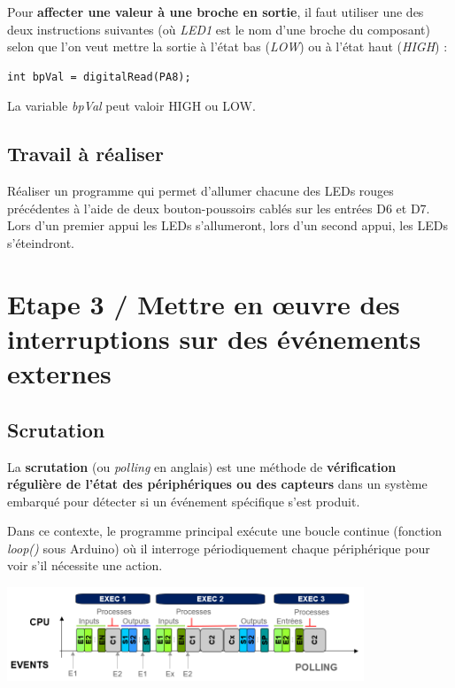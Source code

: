 \documentclass[a4paper,11pt,titlepage]{article} %
\begin{document}
Pour \textbf{affecter une valeur à une broche en sortie}, il faut utiliser une des deux instructions suivantes (où \textsl{LED1} est le nom d'une broche du composant) selon que l'on veut mettre la sortie à l'état bas (\textit{LOW}) ou à l'état haut (\textit{HIGH}) :

\begin{lstlisting}
int bpVal = digitalRead(PA8);
\end{lstlisting}

La variable \textsl{bpVal} peut valoir \textsc{HIGH} ou \textsc{LOW}.

\subsection{Travail à réaliser}

\Manip Réaliser un programme qui permet d'allumer chacune des LEDs rouges précédentes à l'aide de deux bouton-poussoirs cablés sur les entrées D6 et D7. Lors d'un premier appui les LEDs s'allumeront, lors d'un second appui, les LEDs s'éteindront.


\newpage
\section{Etape 3 / Mettre en \oe{}uvre des interruptions sur des événements externes}

\subsection{Scrutation}

La \textbf{scrutation} (ou \textit{polling} en anglais) est une méthode de \textbf{vérification régulière de l'état des périphériques ou des capteurs} dans un système embarqué pour détecter si un événement spécifique s'est produit. 

Dans ce contexte, le programme principal exécute une boucle continue (fonction \textsl{loop()} sous Arduino) où il interroge périodiquement chaque périphérique pour voir s'il nécessite une action. 

\begin{center}
	\includegraphics[width=0.8\textwidth]{images/gen_polling.png}
\end{center}
\end{document}
